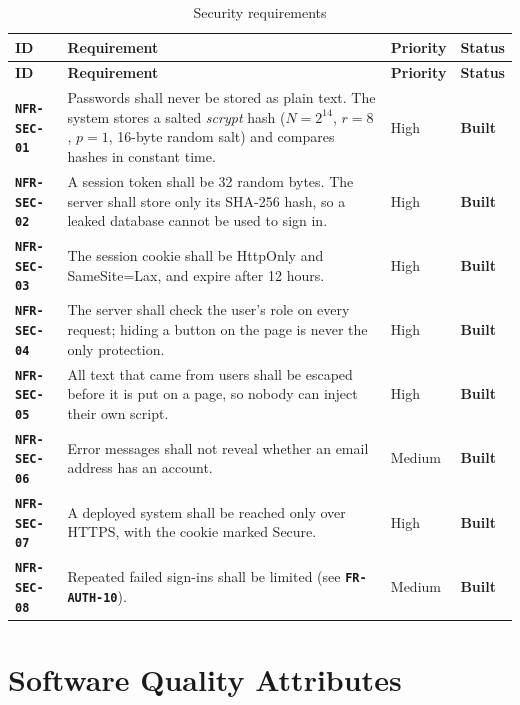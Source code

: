 \documentclass[11pt,a4paper,parskip=half,toc=listof]{scrreprt}
\newcommand{\Built}{\textcolor{builtgreen}{\textbf{Built}}}
\newcommand{\Req}[1]{\textbf{\texttt{#1}}}
\newcommand{\ReqHeader}{%
  \toprule
  \textbf{ID} & \textbf{Requirement} & \textbf{Priority} & \textbf{Status}\\
  \midrule}
\begin{document}
\begin{xltabular}{\linewidth}{@{}L{2.25cm}YL{1.55cm}L{1.6cm}@{}}
  \caption{Security requirements}\label{tab:nfr-sec}\\
  \ReqHeader
  \endfirsthead
  \ReqHeader
  \endhead
  \bottomrule
  \endlastfoot
  \Req{NFR-SEC-01} & Passwords shall never be stored as plain text. The
    system stores a salted \emph{scrypt} hash ($N=2^{14}$, $r=8$, $p=1$,
    16-byte random salt) and compares hashes in constant time. & High &
    \Built\\
  \Req{NFR-SEC-02} & A session token shall be 32 random bytes. The server
    shall store only its SHA-256 hash, so a leaked database cannot be used
    to sign in. & High & \Built\\
  \Req{NFR-SEC-03} & The session cookie shall be HttpOnly and SameSite=Lax,
    and expire after 12 hours. & High & \Built\\
  \Req{NFR-SEC-04} & The server shall check the user's role on every
    request; hiding a button on the page is never the only protection. &
    High & \Built\\
  \Req{NFR-SEC-05} & All text that came from users shall be escaped before
    it is put on a page, so nobody can inject their own script. & High &
    \Built\\
  \Req{NFR-SEC-06} & Error messages shall not reveal whether an email
    address has an account. & Medium & \Built\\
  \Req{NFR-SEC-07} & A deployed system shall be reached only over HTTPS,
    with the cookie marked Secure. & High & \Built\\
  \Req{NFR-SEC-08} & Repeated failed sign-ins shall be limited (see
    \Req{FR-AUTH-10}). & Medium & \Built\\
\end{xltabular}

\section{Software Quality Attributes}
\end{document}
